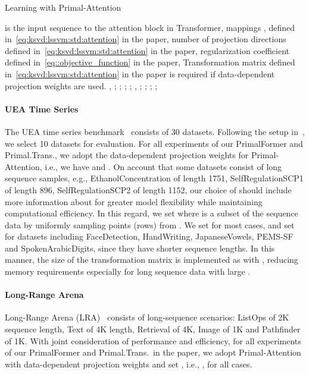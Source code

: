\documentclass{article}
\begin{document}
\begin{algorithm}[ht]
\caption{Learning with Primal-Attention }
\label{alg::primal}
\begin{algorithmic}
	\Require 
	 is the input sequence to the attention block in Transformer, 
	mappings ,  defined in~\eqref{eq:ksvd:lssvm:std:attention} in the paper, 
	number of projection directions  defined in~\eqref{eq:ksvd:lssvm:std:attention} in the paper,
	regularization coefficient  defined in~\eqref{eq::objective_function} in the paper,
	\Ensure
	Transformation matrix  defined in~\eqref{eq:ksvd:lssvm:std:attention} in the paper is required if data-dependent projection weights are used.
	\State , ;
	\Comment{, 
		}
	\State ; 
	\State ; 
	\State ;
	\State , ;
	\Comment{, 
		}
	\State ; 
	\State ; 
	\State ;
	\EndIf
\end{algorithmic}
\end{algorithm}

\paragraph{UEA Time Series}
The UEA time series benchmark~\cite{bagnall2018uea} consists of 30 datasets.
Following the setup in~\cite{wu2022flowformer}, we select 10 datasets for evaluation.
For all experiments of our PrimalFormer and Primal.Trans., we adopt the data-dependent projection weights for Primal-Attention, i.e., we have  
and .
On account that some datasets consist of long sequence samples, e.g., EthanolConcentration of length 1751,
SelfRegulationSCP1 of length 896,
SelfRegulationSCP2 of length 1152,
our choice of  should include more information about  for greater model flexibility while maintaining computational efficiency.
In this regard, we set  where  is a subset of the sequence data  by uniformly sampling  points (rows) from .
We set  for most cases, and set  for datasets including FaceDetection, HandWriting, JapaneseVowels, PEMS-SF and SpokenArabicDigits, since they have shorter sequence lengths.
In this manner, the size of the transformation matrix  is implemented as  with , reducing memory requirements especially for long sequence data with large .

\paragraph{Long-Range Arena}
Long-Range Arena (LRA)~\cite{tay2020long} consists of long-sequence scenarios: ListOps of 2K sequence length, Text of 4K length, Retrieval of 4K, Image of 1K and Pathfinder of 1K.
With joint consideration of performance and efficiency, for all experiments of our PrimalFormer and Primal.Trans.~in the paper, we adopt Primal-Attention with data-dependent projection weights and set , i.e., , for all cases.
\end{document}

